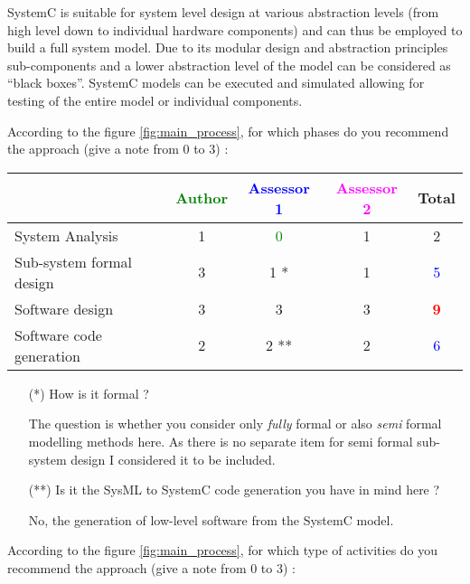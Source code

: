 SystemC is suitable for system level design at various abstraction levels (from high level down to individual hardware components) and can thus be employed to build a full system model. Due to its modular design and abstraction principles sub-components and a lower abstraction level of the model can be considered as ``black boxes''. SystemC models can be executed and simulated allowing for testing of the entire model or individual components.

According to the figure \ref{fig:main_process}, for which phases do you recommend the approach (give a note from 0 to 3) :

\begin{tabular}{|l | c | c | c | c|}
\hline
& \textcolor{green}{Author} & \textcolor{blue}{Assessor 1} & \textcolor{magenta}{Assessor 2} & Total \\
\hline
System Analysis &1 & \textcolor{green}{0} & 1     & 2     \\
\hline
Sub-system formal design & 3     & 1    *  &  1 & \textcolor{blue}{5} \\
\hline
Software design &3 &3 & 3     & \textcolor{red}{\textbf{9}} \\
\hline
Software code generation &2 & 2    ** & 2     & \textcolor{blue}{6} \\
\hline
\end{tabular}
\begin{assessor1}
\begin{itemize}
\item[(*)] How is it formal ?
\begin{author_comment}
The question is whether you consider only \emph{fully} formal or also \emph{semi} formal modelling methods here. As there is no separate item for semi formal sub-system design I considered it to be included.
\end{author_comment}
\item[(**)] Is it the SysML to  SystemC code generation  you have in
  mind here ?
\begin{author_comment}
No, the generation of low-level software from the SystemC model.
\end{author_comment}
\end{itemize}
\end{assessor1}

According to the figure \ref{fig:main_process}, for which type of activities do you recommend the approach (give a note from 0 to 3) :

